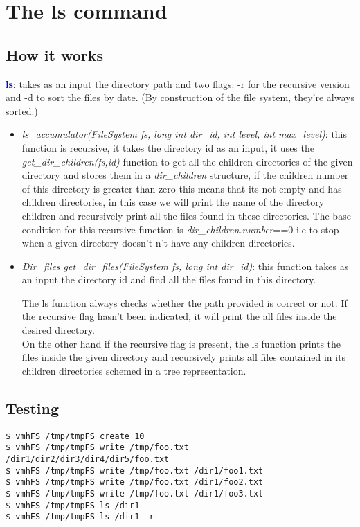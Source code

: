 \section{The ls command}

\subsection{How it works}
\textbf{\textcolor{blue}{ls}}: takes as an input the directory path and two flags: -r for the recursive version and -d to sort the files by date. (By construction of the file system, they're always sorted.)\\

\begin{itemize}
\item \textit {ls\_accumulator(FileSystem fs, long int dir\_id, int level, int max\_level)}: this function is recursive, it takes the directory id as an input, it uses the \textit{get\_dir\_children(fs,id)} function to get all the children directories of the given directory and stores them in a \textit{dir\_children} structure, if the children number of this directory is greater than zero this means that its not empty and has children directories, in this case we will print the name of the directory children and recursively print all the files found in these directories. 
The base condition for this recursive function is \textit{dir\_children.number}==0 i.e to stop when a given directory doesn't n’t have any children directories.\\

\item \textit{Dir\_files get\_dir\_files(FileSystem fs, long int dir\_id)}: this function takes as an input the directory id and find all the files found in this directory.

The ls function always checks whether the path provided is correct or not. If the recursive flag hasn’t been indicated, it will print the all files inside the desired directory. \\

On the other hand if the recursive flag is present, the ls function prints the files inside the given directory and recursively prints all files  contained in its children directories schemed in a tree representation. \\
\end{itemize}

\newpage
\subsection{Testing}
\begin{lstlisting}
$ vmhFS /tmp/tmpFS create 10
$ vmhFS /tmp/tmpFS write /tmp/foo.txt /dir1/dir2/dir3/dir4/dir5/foo.txt
$ vmhFS /tmp/tmpFS write /tmp/foo.txt /dir1/foo1.txt
$ vmhFS /tmp/tmpFS write /tmp/foo.txt /dir1/foo2.txt
$ vmhFS /tmp/tmpFS write /tmp/foo.txt /dir1/foo3.txt
$ vmhFS /tmp/tmpFS ls /dir1
$ vmhFS /tmp/tmpFS ls /dir1 -r
\end{lstlisting}

